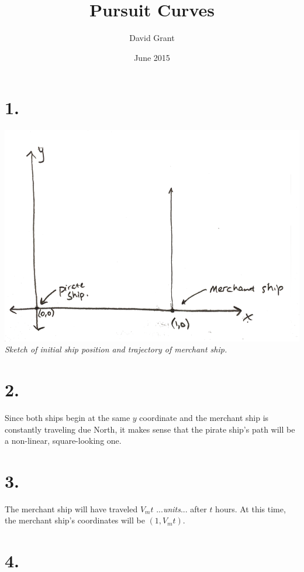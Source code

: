 \documentclass[11pt]{report}
\title{Pursuit Curves}
\author{David Grant}
\date{June 2015}
\begin{document}
\maketitle

\section*{1.}

\begin{center}
\includegraphics[width=\linewidth]{sketch1}
\textit{Sketch of initial ship position and trajectory of
merchant ship.} 
\end{center}

\section*{2.}

Since both ships begin at the same $y$ coordinate and the merchant
ship is constantly traveling due North, it makes sense that the pirate ship's path will be a non-linear, square-looking one.

\section*{3.}

The merchant ship will have traveled $V_{m}t$ ...\textit{units}... after $t$ hours. At this time, the merchant ship's coordinates will be $(1, V_{m}t)$.

\section*{4.}
\end{document}
